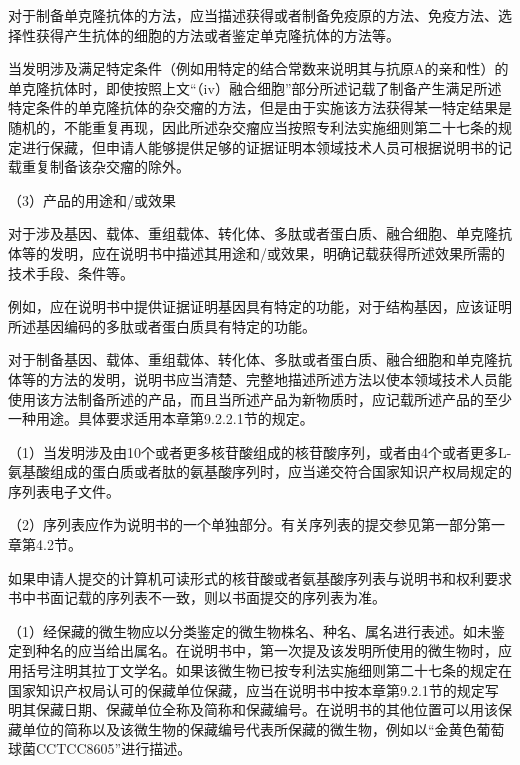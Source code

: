 对于制备单克隆抗体的方法，应当描述获得或者制备免疫原的方法、免疫方法、选择性获得产生抗体的细胞的方法或者鉴定单克隆抗体的方法等。

当发明涉及满足特定条件（例如用特定的结合常数来说明其与抗原A的亲和性）的单克隆抗体时，即使按照上文“（iv）融合细胞”部分所述记载了制备产生满足所述特定条件的单克隆抗体的杂交瘤的方法，但是由于实施该方法获得某一特定结果是随机的，不能重复再现，因此所述杂交瘤应当按照专利法实施细则第二十七条的规定进行保藏，但申请人能够提供足够的证据证明本领域技术人员可根据说明书的记载重复制备该杂交瘤的除外。

{\setlength{\parindent}{17.1bp}（3）产品的用途和/或效果\par}

对于涉及基因、载体、重组载体、转化体、多肽或者蛋白质、融合细胞、单克隆抗体等的发明，应在说明书中描述其用途和/或效果，明确记载获得所述效果所需的技术手段、条件等。

例如，应在说明书中提供证据证明基因具有特定的功能，对于结构基因，应该证明所述基因编码的多肽或者蛋白质具有特定的功能。

对于制备基因、载体、重组载体、转化体、多肽或者蛋白质、融合细胞和单克隆抗体等的方法的发明，说明书应当清楚、完整地描述所述方法以使本领域技术人员能使用该方法制备所述的产品，而且当所述产品为新物质时，应记载所述产品的至少一种用途。具体要求适用本章第9.2.2.1节的规定。

{\setlength{\parindent}{17.1bp}（1）当发明涉及由10个或者更多核苷酸组成的核苷酸序列，或者由4个或者更多L-氨基酸组成的蛋白质或者肽的氨基酸序列时，应当递交符合国家知识产权局规定的序列表电子文件。\par}

{\setlength{\parindent}{17.1bp}（2）序列表应作为说明书的一个单独部分。有关序列表的提交参见第一部分第一章第4.2节。\par}

如果申请人提交的计算机可读形式的核苷酸或者氨基酸序列表与说明书和权利要求书中书面记载的序列表不一致，则以书面提交的序列表为准。

{\setlength{\parindent}{17.1bp}（1）经保藏的微生物应以分类鉴定的微生物株名、种名、属名进行表述。如未鉴定到种名的应当给出属名。在说明书中，第一次提及该发明所使用的微生物时，应用括号注明其拉丁文学名。如果该微生物已按专利法实施细则第二十七条的规定在国家知识产权局认可的保藏单位保藏，应当在说明书中按本章第9.2.1节的规定写明其保藏日期、保藏单位全称及简称和保藏编号。在说明书的其他位置可以用该保藏单位的简称以及该微生物的保藏编号代表所保藏的微生物，例如以“金黄色葡萄球菌CCTCC8605”进行描述。\par}

